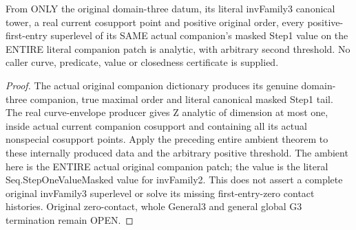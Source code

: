 \begin{theorem}
\label{hir:step-one-positive-original-general-three-consumer}
\leanok
{}
From ONLY the original domain-three datum, its literal invFamily3 canonical
tower, a real current cosupport point and positive original order, every
positive-first-entry superlevel of its SAME actual companion's masked Step1
value on the ENTIRE literal companion patch is analytic, with arbitrary
second threshold. No caller curve, predicate, value or closedness certificate
is supplied.
\end{theorem}
\begin{proof}
The actual original companion dictionary produces its genuine domain-three
companion, true maximal order and literal canonical masked Step1 tail. The
real curve-envelope producer gives Z analytic of dimension at most one,
inside actual current companion cosupport and containing all its actual
nonspecial cosupport points. Apply the preceding entire ambient theorem to
these internally produced data and the arbitrary positive threshold. The
ambient here is the ENTIRE actual original companion patch; the value is the
literal Seq.StepOneValueMasked value for invFamily2. This does not assert a
complete original invFamily3 superlevel or solve its missing first-entry-zero
contact histories. Original zero-contact, whole General3 and general global
G3 termination remain OPEN.
\end{proof}
